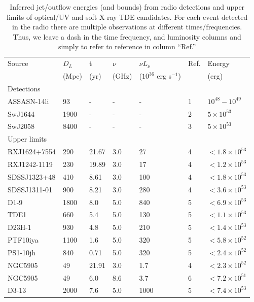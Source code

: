 \documentclass[usenatbib,fleqn]{mnras}
\begin{document}
\begin{table}
\begin{threeparttable}
  \caption{\label{tab:enConstr} Inferred jet/outflow energies (and
    bounds) from radio detections and upper limits of optical/UV and
    soft X-ray TDE candidates. For each event detected in the radio
    there are multiple observations at different
    times/frequencies. Thus, we leave a dash in the time frequency,
    and luminosity columns and simply to refer to reference in column
    ``Ref.''}
\begin{tabular*}{1.5\columnwidth}{lllllll}
\hline
Source & $D_L$ & t & $\nu$ & $\nu L_{\nu}$ & Ref. & Energy\\
& (Mpc) & (yr) & (GHz) & ($10^{36}$ erg s$^{-1}$) & & (erg) \\
\hline
Detections \\
\hline
ASSASN-14li & 93 & - & - & - & 1 &  $10^{48}-10^{49}$\\
SwJ1644 & 1900 & - & - & - &  2  & $5\times 10^{53}$\\
SwJ2058 & 8400  & - & - & - & 3 & $5\times 10^{53}$\\ 
\hline 
Upper limits & \\
\hline
RXJ1624+7554 & 290 & 21.67 & 3.0 & 27 & 4 & $< 1.8 \times 10^{ 53 }$ \\
RXJ1242-1119 & 230 & 19.89 & 3.0 & 17 & 4 & $< 1.2 \times 10^{ 53 }$ \\
SDSSJ1323+48 & 410 & 8.61 & 3.0 & 100 & 4 & $< 1.8 \times 10^{ 53 }$ \\
SDSSJ1311-01 & 900 & 8.21 & 3.0 & 280 & 4 & $< 3.6 \times 10^{ 53 }$ \\
D1-9 & 1800 & 8.0 & 5.0 & 840 & 5 & $< 6.9 \times 10^{ 53 }$ \\
TDE1 & 660 & 5.4 & 5.0 & 130 & 5 & $< 1.1 \times 10^{ 53 }$ \\
D23H-1 & 930 & 4.8 & 5.0 & 210 & 5 & $< 1.4 \times 10^{ 53 }$ \\
PTF10iya & 1100 & 1.6 & 5.0 & 320 & 5 & $< 5.8 \times 10^{ 52 }$ \\
PS1-10jh & 840 & 0.71 & 5.0 & 320 & 5 & $< 2.4 \times 10^{ 52 }$\\
NGC5905 & 49 & 21.91 & 3.0 & 1.7 & 4 & $< 2.3 \times 10^{ 52 }$ \\
NGC5905 & 49 & 6.0 & 8.6 & 3.7 & 6 & $< 7.2 \times 10^{ 51 }$ \\
D3-13 & 2000 & 7.6 & 5.0 & 1000 & 5 & $< 7.4 \times 10^{ 53 }$ \\

\end{tabular*}
\end{threeparttable}
\end{table}
\end{document}
